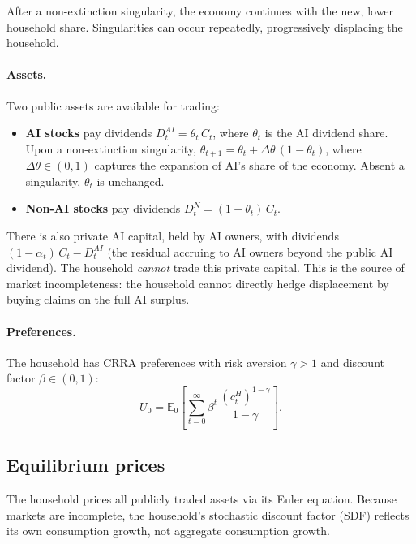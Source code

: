 \documentclass[12pt]{article}
\begin{document}
\noindent After a non-extinction singularity, the economy continues with the new, lower household share. Singularities can occur repeatedly, progressively displacing the household.

\paragraph{Assets.}
Two public assets are available for trading:
%
\begin{itemize}
\item \textbf{AI stocks} pay dividends $D_t^{AI} = \theta_t \, C_t$, where $\theta_t$ is the AI dividend share. Upon a non-extinction singularity, $\theta_{t+1} = \theta_t + \Delta\theta \, (1 - \theta_t)$, where $\Delta\theta \in (0,1)$ captures the expansion of AI's share of the economy. Absent a singularity, $\theta_t$ is unchanged.
\item \textbf{Non-AI stocks} pay dividends $D_t^{N} = (1 - \theta_t) \, C_t$.
\end{itemize}

\noindent There is also private AI capital, held by AI owners, with dividends $(1 - \alpha_t) \, C_t - D_t^{AI}$ (the residual accruing to AI owners beyond the public AI dividend). The household \emph{cannot} trade this private capital. This is the source of market incompleteness: the household cannot directly hedge displacement by buying claims on the full AI surplus.

\paragraph{Preferences.}
The household has CRRA preferences with risk aversion $\gamma > 1$ and discount factor $\beta \in (0,1)$:
%
\begin{equation}
U_0 = \mathbb{E}_0 \left[ \sum_{t=0}^{\infty} \beta^t \, \frac{(c_t^H)^{1-\gamma}}{1 - \gamma} \right]. \label{eq:utility}
\end{equation}

\subsection{Equilibrium prices} %

The household prices all publicly traded assets via its Euler equation. Because markets are incomplete, the household's stochastic discount factor (SDF) reflects its own consumption growth, not aggregate consumption growth.
\end{document}
